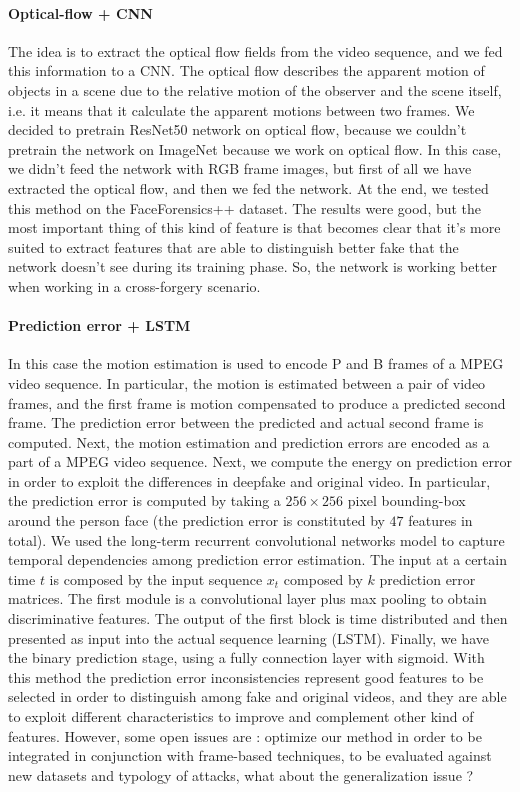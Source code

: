 \documentclass[11pt]{article}
\begin{document}
\paragraph{Optical-flow + CNN} The idea is to extract the optical flow fields from the video sequence, and we fed this information to a CNN. The optical flow describes the apparent motion of objects in a scene due to the relative motion of the observer and the scene itself, i.e. it means that it calculate the apparent motions between two frames. We decided to pretrain ResNet50 network on optical flow, because we couldn't pretrain the network on ImageNet because we work on optical flow. In this case, we didn't feed the network with RGB frame images, but first of all we have extracted the optical flow, and then we fed the network. At the end, we tested this method on the FaceForensics++ dataset. The results were good, but the most important thing of this kind of feature is that becomes clear that it's more suited to extract features that are able to distinguish better fake that the network doesn't see during its training phase. So, the network is working better when working in a cross-forgery scenario. 

\paragraph{Prediction error + LSTM} In this case the motion estimation is used to encode P and B frames of a MPEG video sequence. In particular, the motion is estimated between a pair of video frames, and the first frame is motion compensated to produce a predicted second frame. The prediction error between the predicted and actual second frame is computed. Next, the motion estimation and prediction errors are encoded as a part of a MPEG video sequence. Next, we compute the energy on prediction error in order to exploit the differences in deepfake and original video. In particular, the prediction error is computed by taking a $256 \times 256$ pixel bounding-box around the person face (the prediction error is constituted by $47$ features in total). We used the long-term recurrent convolutional networks model to capture temporal dependencies among prediction error estimation. The input at a certain time $t$ is composed by the input sequence $x_{t}$ composed by $k$ prediction error matrices. The first module is a convolutional layer plus max pooling to obtain discriminative features. The output of the first block is time distributed and then presented as input into the actual sequence learning (LSTM). Finally, we have the binary prediction stage, using a fully connection layer with sigmoid. With this method the prediction error inconsistencies represent good features to be selected in order to distinguish among fake and original videos, and they are able to exploit different characteristics to improve and complement other kind of features. However, some open issues are : optimize our method in order to be integrated in conjunction with frame-based techniques, to be evaluated against new datasets and typology of attacks, what about the generalization issue ?
\end{document}

